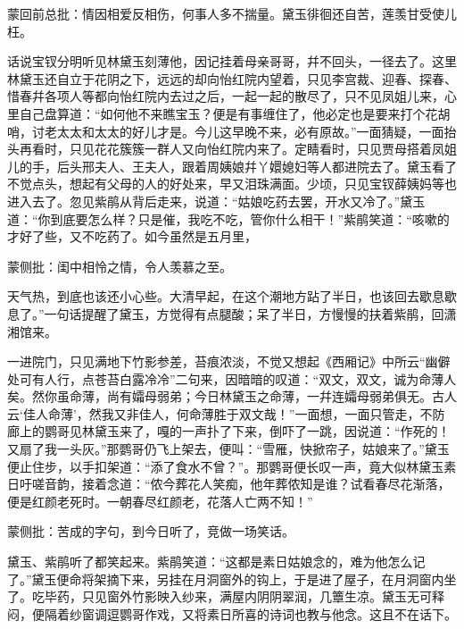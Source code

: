 
\begin{parag}

    \begin{note}蒙回前总批：情因相爱反相伤，何事人多不揣量。黛玉徘徊还自苦，莲羡甘受使儿枉。\end{note}
\end{parag}

\begin{parag}

    话说宝钗分明听见林黛玉刻薄他，因记挂着母亲哥哥，幷不回头，一径去了。这里林黛玉还自立于花阴之下，远远的却向怡红院内望着，只见李宫裁、迎春、探春、惜春幷各项人等都向怡红院内去过之后，一起一起的散尽了，只不见凤姐儿来，心里自己盘算道：“如何他不来瞧宝玉？便是有事缠住了，他必定也是要来打个花胡哨，讨老太太和太太的好儿才是。今儿这早晚不来，必有原故。”一面猜疑，一面抬头再看时，只见花花簇簇一群人又向怡红院内来了。定睛看时，只见贾母搭着凤姐儿的手，后头邢夫人、王夫人，跟着周姨娘幷丫嬛媳妇等人都进院去了。黛玉看了不觉点头，想起有父母的人的好处来，早又泪珠满面。少顷，只见宝钗薛姨妈等也进入去了。忽见紫鹃从背后走来，说道：“姑娘吃药去罢，开水又冷了。”黛玉道：“你到底要怎么样？只是催，我吃不吃，管你什么相干！”紫鹃笑道：“咳嗽的才好了些，又不吃药了。如今虽然是五月里，\begin{note}蒙侧批：闺中相怜之情，令人羡慕之至。\end{note}天气热，到底也该还小心些。大清早起，在这个潮地方跕了半日，也该回去歇息歇息了。”一句话提醒了黛玉，方觉得有点腿酸；呆了半日，方慢慢的扶着紫鹃，回潇湘馆来。
\end{parag}


\begin{parag}


    一进院门，只见满地下竹影参差，苔痕浓淡，不觉又想起《西厢记》中所云“幽僻处可有人行，点苍苔白露冷冷”二句来，因暗暗的叹道：“双文，双文，诚为命薄人矣。然你虽命薄，尚有孀母弱弟；今日林黛玉之命薄，一幷连孀母弱弟俱无。古人云‘佳人命薄’，然我又非佳人，何命薄胜于双文哉！”一面想，一面只管走，不防廊上的鹦哥见林黛玉来了，嘎的一声扑了下来，倒吓了一跳，因说道：“作死的！又扇了我一头灰。”那鹦哥仍飞上架去，便叫：“雪雁，快掀帘子，姑娘来了。”黛玉便止住步，以手扣架道：“添了食水不曾？”。那鹦哥便长叹一声，竟大似林黛玉素日吁嗟音韵，接着念道：“侬今葬花人笑痴，他年葬侬知是谁？试看春尽花渐落，便是红颜老死时。一朝春尽红颜老，花落人亡两不知！”\begin{note}蒙侧批：苦成的字句，到今日听了，竞做一场笑话。\end{note}黛玉、紫鹃听了都笑起来。紫鹃笑道：“这都是素日姑娘念的，难为他怎么记了。”黛玉便命将架摘下来，另挂在月洞窗外的钩上，于是进了屋子，在月洞窗内坐了。吃毕药，只见窗外竹影映入纱来，满屋内阴阴翠润，几簟生凉。黛玉无可释闷，便隔着纱窗调逗鹦哥作戏，又将素日所喜的诗词也教与他念。这且不在话下。
\end{parag}


